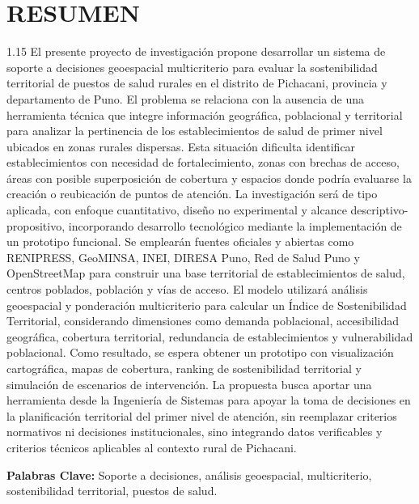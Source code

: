 \documentclass[12pt,a4paper,oneside]{article}
\begin{document}
\newpage

\section*{RESUMEN}
\begin{spacing}{1.15}
El presente proyecto de investigación propone desarrollar un sistema de soporte a decisiones geoespacial multicriterio para evaluar la sostenibilidad territorial de puestos de salud rurales en el distrito de Pichacani, provincia y departamento de Puno. El problema se relaciona con la ausencia de una herramienta técnica que integre información geográfica, poblacional y territorial para analizar la pertinencia de los establecimientos de salud de primer nivel ubicados en zonas rurales dispersas. Esta situación dificulta identificar establecimientos con necesidad de fortalecimiento, zonas con brechas de acceso, áreas con posible superposición de cobertura y espacios donde podría evaluarse la creación o reubicación de puntos de atención. La investigación será de tipo aplicada, con enfoque cuantitativo, diseño no experimental y alcance descriptivo-propositivo, incorporando desarrollo tecnológico mediante la implementación de un prototipo funcional. Se emplearán fuentes oficiales y abiertas como RENIPRESS, GeoMINSA, INEI, DIRESA Puno, Red de Salud Puno y OpenStreetMap para construir una base territorial de establecimientos de salud, centros poblados, población y vías de acceso. El modelo utilizará análisis geoespacial y ponderación multicriterio para calcular un Índice de Sostenibilidad Territorial, considerando dimensiones como demanda poblacional, accesibilidad geográfica, cobertura territorial, redundancia de establecimientos y vulnerabilidad poblacional. Como resultado, se espera obtener un prototipo con visualización cartográfica, mapas de cobertura, ranking de sostenibilidad territorial y simulación de escenarios de intervención. La propuesta busca aportar una herramienta desde la Ingeniería de Sistemas para apoyar la toma de decisiones en la planificación territorial del primer nivel de atención, sin reemplazar criterios normativos ni decisiones institucionales, sino integrando datos verificables y criterios técnicos aplicables al contexto rural de Pichacani.
\end{spacing}

\vspace{0.5cm}
\noindent\textbf{Palabras Clave:} Soporte a decisiones, análisis geoespacial, multicriterio, sostenibilidad territorial, puestos de salud.
\end{document}

